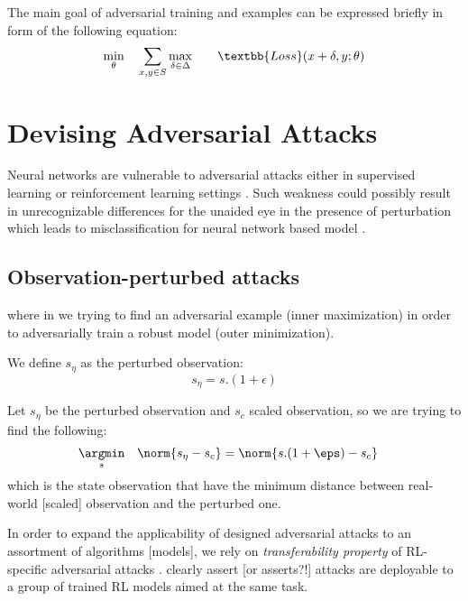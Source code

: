 \documentclass{article}
\begin{document}
    The main goal of adversarial training and examples can be expressed briefly in form of the following equation:
    \begin{equation}
        \begin{aligned}
            & \underset{\theta}{\min}
            & & \sum_{x,y \in S} \underset{\delta \in \Delta}{\max}
            & & & \textbb{Loss}(x + \delta, y; \theta)
        \end{aligned}
    \end{equation}

    \section{Devising Adversarial Attacks}
    Neural networks are vulnerable to adversarial attacks either in supervised learning or reinforcement learning settings \cite{Huang2017}. Such weakness could possibly result in unrecognizable differences for the unaided eye in the presence of perturbation which leads to misclassification for neural network based model \cite{Szegedy2014, Goodfellow2014}.


    \subsection{Observation-perturbed attacks}


    where in we trying to find an adversarial example (inner maximization) in order to adversarially train a robust model (outer minimization).

    We define $s_\eta$ as the perturbed observation:
    \begin{equation}
        s_\eta = s . (1 + \epsilon)
    \end{equation}


    Let $s_\eta$ be the perturbed observation and $s_c$ scaled observation, so we are trying to find the following:
    \begin{equation}
        \begin{aligned}
            & \underset{s}{\argmin}
            & & {\norm{s_\eta - s_c}} = \norm{s . (1 + \eps) - s_c}
        \end{aligned}
    \end{equation}
    which is the state observation that have the minimum distance between real-world [scaled] observation and the perturbed one.

    In order to expand the applicability of designed adversarial attacks to an assortment of algorithms [models], we rely on \textit{transferability property} of RL-specific adversarial attacks \cite{Szegedy2014, Papernot2016, Goodfellow2014a}. \cite{Huang2017} clearly assert [or asserts?!] attacks are deployable to a group of trained RL models aimed at the same task.
\end{document}
